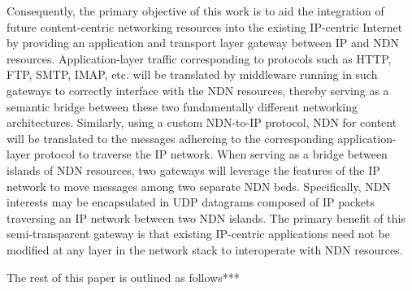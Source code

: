 Consequently, the primary objective of this work is to aid the integration of future content-centric networking resources into the existing IP-centric Internet by providing an application and transport layer gateway between IP and NDN resources. Application-layer traffic corresponding to protocols such as HTTP, FTP, SMTP, IMAP, etc. will be translated by middleware running in such gateways to correctly interface with the NDN resources, thereby serving as a semantic bridge between these two fundamentally different networking architectures. Similarly, using a custom NDN-to-IP protocol, NDN  for content will be translated to the messages adhereing to the corresponding application-layer protocol to traverse the IP network. When serving as a bridge between islands of NDN resources, two gateways will leverage the features of the IP network to move messages among two separate NDN beds. Specifically, NDN interests may be encapsulated in UDP datagrams composed of IP packets traversing an IP network between two NDN islands. The primary benefit of this semi-transparent gateway is that existing IP-centric applications need not be modified at any layer in the network stack to interoperate with NDN resources. 

The rest of this paper is outlined as follows***


